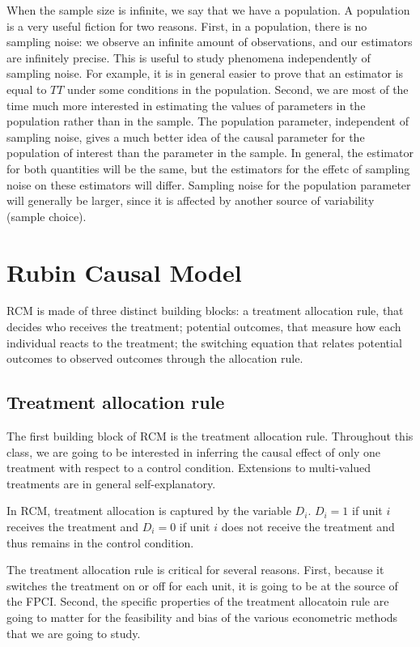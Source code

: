 \documentclass[]{book}
\theoremstyle{definition}
\theoremstyle{definition}
\theoremstyle{definition}
\theoremstyle{remark}
\begin{document}
When the sample size is infinite, we say that we have a population. A
population is a very useful fiction for two reasons. First, in a
population, there is no sampling noise: we observe an infinite amount of
observations, and our estimators are infinitely precise. This is useful
to study phenomena independently of sampling noise. For example, it is
in general easier to prove that an estimator is equal to \(TT\) under
some conditions in the population. Second, we are most of the time much
more interested in estimating the values of parameters in the population
rather than in the sample. The population parameter, independent of
sampling noise, gives a much better idea of the causal parameter for the
population of interest than the parameter in the sample. In general, the
estimator for both quantities will be the same, but the estimators for
the effetc of sampling noise on these estimators will differ. Sampling
noise for the population parameter will generally be larger, since it is
affected by another source of variability (sample choice).

\section{Rubin Causal Model}\label{rubin-causal-model}

RCM is made of three distinct building blocks: a treatment allocation
rule, that decides who receives the treatment; potential outcomes, that
measure how each individual reacts to the treatment; the switching
equation that relates potential outcomes to observed outcomes through
the allocation rule.

\subsection{Treatment allocation rule}\label{treatment-allocation-rule}

The first building block of RCM is the treatment allocation rule.
Throughout this class, we are going to be interested in inferring the
causal effect of only one treatment with respect to a control condition.
Extensions to multi-valued treatments are in general self-explanatory.

In RCM, treatment allocation is captured by the variable \(D_i\).
\(D_i=1\) if unit \(i\) receives the treatment and \(D_i=0\) if unit
\(i\) does not receive the treatment and thus remains in the control
condition.

The treatment allocation rule is critical for several reasons. First,
because it switches the treatment on or off for each unit, it is going
to be at the source of the FPCI. Second, the specific properties of the
treatment allocatoin rule are going to matter for the feasibility and
bias of the various econometric methods that we are going to study.
\end{document}
